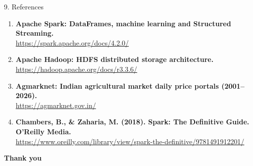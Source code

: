 \documentclass[aspectratio=169,10pt]{beamer}
\begin{document}
\begin{frame}{9. References}
  \vspace{0.2cm}
  \begin{enumerate}
    \item \textbf{Apache Spark: DataFrames, machine learning and Structured Streaming.}\\[0.1em]
      {\footnotesize\url{https://spark.apache.org/docs/4.2.0/}}
    \vspace{0.2cm}
    \item \textbf{Apache Hadoop: HDFS distributed storage architecture.}\\[0.1em]
      {\footnotesize\url{https://hadoop.apache.org/docs/r3.3.6/}}
    \vspace{0.2cm}
    \item \textbf{Agmarknet: Indian agricultural market daily price portals (2001--2026).}\\[0.1em]
      {\footnotesize\url{https://agmarknet.gov.in/}}
    \vspace{0.2cm}
    \item \textbf{Chambers, B., \& Zaharia, M. (2018). Spark: The Definitive Guide. O'Reilly Media.}\\[0.1em]
      {\footnotesize\url{https://www.oreilly.com/library/view/spark-the-definitive/9781491912201/}}
  \end{enumerate}

  \vspace{0.35cm}

  \vspace{0.5cm}
  \begin{center}
    {\huge\bfseries\color{refRed} Thank you}
  \end{center}
\end{frame}
\end{document}
